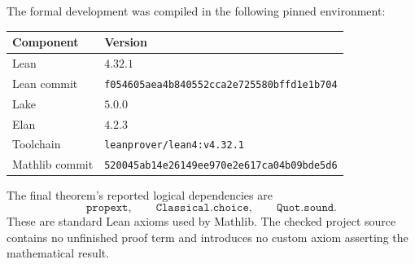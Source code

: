 \documentclass[11pt]{article}
\theoremstyle{remark}
\begin{document}
The formal development was compiled in the following pinned environment:
\begin{center}
\begin{tabular}{@{}ll@{}}
\toprule
Component & Version\\
\midrule
Lean & \(4.32.1\)\\
Lean commit & \texttt{f054605aea4b840552cca2e725580bffd1e1b704}\\
Lake & \(5.0.0\)\\
Elan & \(4.2.3\)\\
Toolchain & \texttt{leanprover/lean4:v4.32.1}\\
Mathlib commit & \texttt{520045ab14e26149ee970e2e617ca04b09bde5d6}\\
\bottomrule
\end{tabular}
\end{center}

The final theorem's reported logical dependencies are
\[
  \texttt{propext},\qquad
  \texttt{Classical.choice},\qquad
  \texttt{Quot.sound}.
\]
These are standard Lean axioms used by Mathlib.  The checked project source
contains no unfinished proof term and introduces no custom axiom asserting
the mathematical result.
\end{document}
